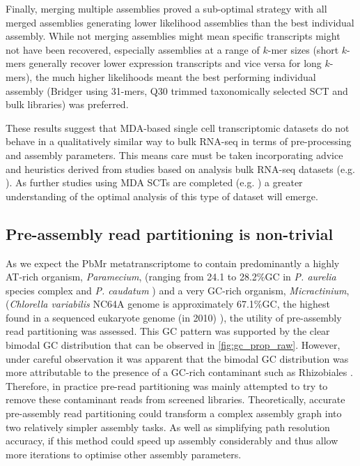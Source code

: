 Finally, merging multiple assemblies proved a sub-optimal strategy with all
merged assemblies generating lower likelihood assemblies than the
best individual assembly.  While not merging assemblies might mean specific
transcripts might not have been recovered, especially assemblies at a range
of \(k\)-mer sizes (short \(k\)-mers generally recover lower expression transcripts
and vice versa for long \(k\)-mers), the much higher likelihoods meant the
best performing individual assembly (Bridger using 31-mers, Q30 trimmed
taxonomically selected SCT and bulk libraries) was preferred.

These results suggest that MDA-based single cell transcriptomic datasets
do not behave in a qualitatively similar way to bulk RNA-seq in terms of
pre-processing and assembly parameters.  
This means care must be taken incorporating advice and heuristics
derived from studies based on analysis bulk RNA-seq datasets (e.g. \citep{Macmanes2013,Macmanes2014,Macmanes2015,Nakasugi2014}).
As further studies using MDA SCTs are completed (e.g. \citep{Kolisko2014}) 
a greater understanding of the optimal analysis of this type of 
dataset will emerge.

\subsection{Pre-assembly read partitioning is non-trivial}

As we expect the PbMr metatranscriptome to contain predominantly a highly AT-rich organism, \textit{Paramecium},
(ranging from 24.1 to 28.2\%GC in \textit{P. aurelia} species complex and \textit{P. caudatum} \citep{Aury2006,McGrath2014})
and a very GC-rich organism, \textit{Micractinium}, (\textit{Chlorella variabilis} NC64A genome is approximately 67.1\%GC, the highest
found in a sequenced eukaryote genome (in 2010) \citep{Blanc2010}), the utility of pre-assembly read partitioning was assessed.
This GC pattern was supported by the clear bimodal GC distribution that can be observed in \cref{fig:gc_prop_raw}.
However, under careful observation it was apparent that the bimodal GC distribution was more attributable to 
the presence of a GC-rich contaminant such as Rhizobiales \citep{Peralta2011}.  Therefore, in practice pre-read partitioning was mainly attempted to 
try to remove these contaminant reads from screened libraries.
Theoretically, accurate pre-assembly read partitioning could transform a complex assembly graph into two relatively simpler
assembly tasks.  As well as simplifying path resolution accuracy, if this method could
 speed up assembly considerably and thus allow more iterations to optimise other
assembly parameters.


